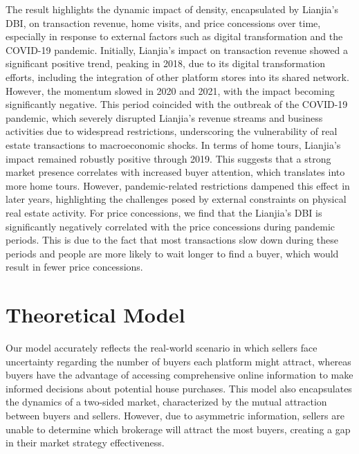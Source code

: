 \documentclass[12pt]{article}
\begin{document}
The result highlights the dynamic impact of density, encapsulated by Lianjia's DBI, on transaction revenue, home visits, and price concessions over time, especially in response to external factors such as digital transformation and the COVID-19 pandemic. Initially, Lianjia's impact on transaction revenue showed a significant positive trend, peaking in 2018, due to its digital transformation efforts, including the integration of other platform stores into its shared network.  However, the momentum slowed in 2020 and 2021, with the impact becoming significantly negative. This period coincided with the outbreak of the COVID-19 pandemic, which severely disrupted Lianjia's revenue streams and business activities due to widespread restrictions, underscoring the vulnerability of real estate transactions to macroeconomic shocks. In terms of home tours, Lianjia's impact remained robustly positive through 2019. This suggests that a strong market presence correlates with increased buyer attention, which translates into more home tours. However, pandemic-related restrictions dampened this effect in later years, highlighting the challenges posed by external constraints on physical real estate activity. For price concessions, we find that the Lianjia's DBI is significantly negatively correlated with the price concessions during pandemic periods. This is due to the fact that most transactions slow down during these periods and people are more likely to wait longer to find a buyer, which would result in fewer price concessions.



\section{Theoretical Model} \label{sec:theoretical_model}

Our model accurately reflects the real-world scenario in which sellers face uncertainty regarding the number of buyers each platform might attract, whereas buyers have the advantage of accessing comprehensive online information to make informed decisions about potential house purchases. This model also encapsulates the dynamics of a two-sided market, characterized by the mutual attraction between buyers and sellers. However, due to asymmetric information, sellers are unable to determine which brokerage will attract the most buyers, creating a gap in their market strategy effectiveness.
\end{document}
